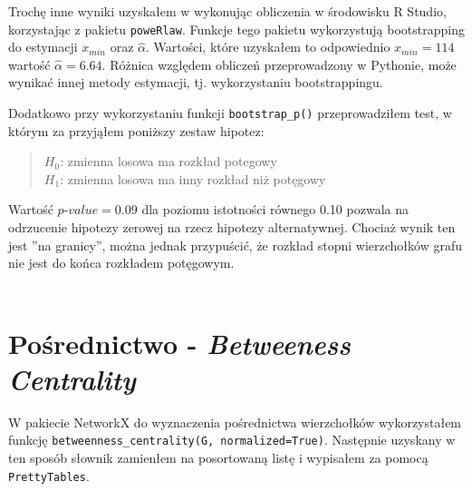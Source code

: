 \documentclass[a4paper,10pt]{article}
\begin{document}
		Trochę inne wyniki uzyskałem w wykonując obliczenia w środowisku R Studio, korzystając z pakietu \texttt{poweRlaw}. Funkcje tego pakietu wykorzystują bootstrapping do estymacji
		$x_{min}$ oraz $\hat{\alpha}$. Wartości, które uzyskałem to odpowiednio $x_{min} = 114$ wartość $\hat{\alpha} =6.64$. Różnica względem obliczeń przeprowadzony w Pythonie, może wynikać innej metody estymacji, tj. wykorzystaniu bootstrappingu.

		Dodatkowo przy wykorzystaniu funkcji \texttt{bootstrap\_p()} przeprowadziłem test, w którym za przyjąłem poniższy zestaw hipotez:
		\begin{quote}
		$H_0$: zmienna losowa ma rozkład potegowy\\
		$H_1$: zmienna losowa ma inny rozkład niż potęgowy
		\end{quote}
		Wartość $\textit{p-value} = 0.09$ dla poziomu istotności równego 0.10 pozwala na odrzucenie hipotezy zerowej na rzecz hipotezy alternatywnej. Chociaż wynik ten jest ''na granicy'', można jednak przypuścić, że rozkład stopni wierzchołków grafu nie jest do końca rozkładem potęgowym.\linebreak\\\\

		\pagebreak
	\section{Pośrednictwo - \emph{Betweeness Centrality}}
			W pakiecie NetworkX do wyznaczenia pośrednictwa wierzchołków wykorzystałem funkcję \texttt{betweenness\_centrality(G, normalized=True)}. Następnie uzyskany w ten sposób słownik zamienłem na posortowaną listę i wypisałem za pomocą \texttt{PrettyTables}. 
\end{document}
